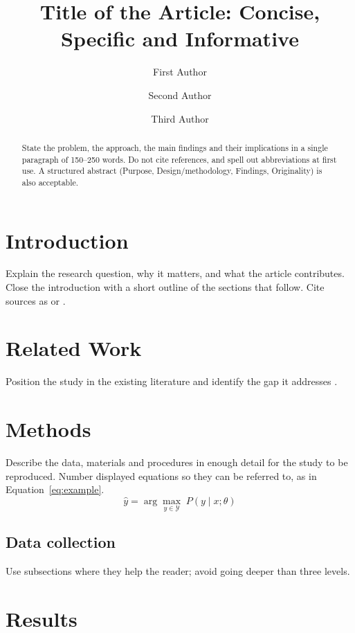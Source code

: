 \documentclass[journal,anonymous,lineno,{{CITEOPT}}]{nextgeniq}
\title{Title of the Article: Concise, Specific and Informative}
\author[1]{First Author}
\author[2]{Second Author}
\author[1]{Third Author}
\affil[1]{Department, University, City, Country}
\affil[2]{Department, Institution, City, Country}
\begin{document}
\maketitle

\begin{abstract}
State the problem, the approach, the main findings and their implications in a
single paragraph of 150--250 words. Do not cite references, and spell out
abbreviations at first use. A structured abstract (Purpose, Design/methodology,
Findings, Originality) is also acceptable.
\end{abstract}

\section{Introduction}
\label{sec:intro}

Explain the research question, why it matters, and what the article
contributes. Close the introduction with a short outline of the sections that
follow. Cite sources as \citet{smith2024} or \citep{lee2023,garcia2022}.

\section{Related Work}
\label{sec:related}

Position the study in the existing literature and identify the gap it
addresses \citep{garcia2022}.

\section{Methods}
\label{sec:methods}

Describe the data, materials and procedures in enough detail for the study to
be reproduced. Number displayed equations so they can be referred to, as in
Equation~\eqref{eq:example}.
\begin{equation}
  \hat{y} = \arg\max_{y \in \mathcal{Y}} \; P(y \mid x; \theta)
  \label{eq:example}
\end{equation}

\subsection{Data collection}
Use subsections where they help the reader; avoid going deeper than three
levels.

\section{Results}
\label{sec:results}
\end{document}
